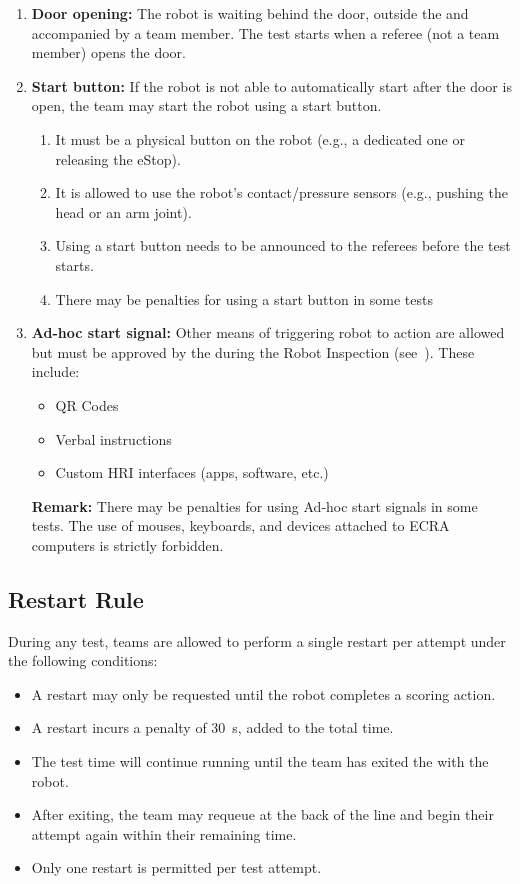\begin{enumerate}
	\item \textbf{Door opening:} The robot is waiting behind the door, outside the \Arena{} and accompanied by a team member.
	The test starts when a referee (not a team member) opens the door.

	\item \textbf{Start button:} If the robot is not able to automatically start after the door is open, the team may start the robot using a start button.
	\begin{enumerate}[nosep]
		\item It must be a physical button on the robot (e.g., a dedicated one or releasing the eStop).
		\item It is allowed to use the robot's contact/pressure sensors (e.g., pushing the head or an arm joint).
		\item Using a start button needs to be announced to the referees before the test starts.
		\item There may be penalties for using a start button in some tests
	\end{enumerate}

	\item \textbf{Ad-hoc start signal:} Other means of triggering robot to action are allowed but must be approved by the  during the Robot Inspection (see~).
	These include:
	\begin{itemize}[nosep]
		\item QR Codes
		\item Verbal instructions
		\item Custom HRI interfaces (apps, software, etc.)
	\end{itemize}
	\textbf{Remark:} There may be penalties for using Ad-hoc start signals in some tests. The use of mouses, keyboards, and devices attached to ECRA computers is strictly forbidden.

\end{enumerate}

\subsection{Restart Rule}
\label{rule:restart}

During any test, teams are allowed to perform a single restart per attempt under the following conditions:
\begin{itemize}
    \item A restart may only be requested until the robot completes a scoring action.
    \item A restart incurs a penalty of \SI{30}{\second}, added to the total time.
    \item The test time will continue running until the team has exited the \Arena{} with the robot.
    \item After exiting, the team may requeue at the back of the line and begin their attempt again within their remaining time.
    \item Only one restart is permitted per test attempt.
\end{itemize}

